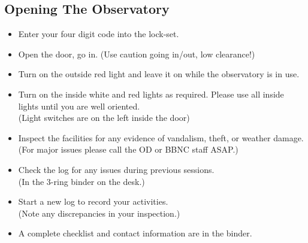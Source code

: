 \subsection{Opening The Observatory}
\begin{frame}{\insertsubsectionhead}
  \Large
  \begin{itemize}
    \item Enter your four digit code into the lock-set.
    \item Open the door, go in. (Use caution going in/out, low clearance!)
    \item Turn on the outside red light and leave it on while the observatory
       is in use.
    \item Turn on the inside white and red lights as required. Please use all
       inside lights until you are well oriented.\\
       (Light switches are on the left inside the door)
  \end{itemize}
\end{frame}

\begin{frame}{\insertsubsectionhead}
  \Large
  \begin{itemize}
    \item Inspect the facilities for any evidence of vandalism, theft,
     or weather damage. \\
     (For major issues please call the OD or BBNC staff ASAP.)
    \item Check the log for any issues during previous sessions.\\
     (In the 3-ring binder on the desk.)
    \item Start a new log to record your activities. \\
     (Note any discrepancies in your inspection.)
    \item A complete checklist and contact information are in the binder.
  \end{itemize}
\end{frame}


